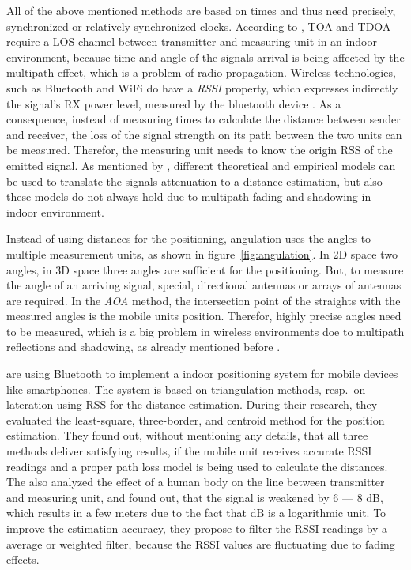 All of the above mentioned methods are based on times and thus need precisely, synchronized or relatively synchronized clocks. According to \citet{IEEE:survey_wireless_indoor_pos}, \acs{TOA} and \acs{TDOA} require a \acs{LOS} channel between transmitter and measuring unit in an indoor environment, because time and angle of the signals arrival is being affected by the multipath effect, which is a problem of radio propagation. Wireless technologies, such as Bluetooth and WiFi do have a \emph{\ac{RSSI}} property, which expresses indirectly the signal's RX power level, measured by the bluetooth device \citep{kotanen:exp_local_pos_bt}. As a consequence, instead of measuring times to calculate the distance between sender and receiver, the loss of the signal strength on its path between the two units can be measured. Therefor, the measuring unit needs to know the origin \ac{RSS} of the emitted signal. As mentioned by \citet{IEEE:survey_wireless_indoor_pos}, different theoretical and empirical models can be used to translate the signals attenuation to a distance estimation, but also these models do not always hold due to multipath fading and shadowing in indoor environment.

Instead of using distances for the positioning, angulation uses the angles to multiple measurement units, as shown in figure~\ref{fig:angulation}. In 2D space two angles, in 3D space three angles are sufficient for the positioning. But, to measure the angle of an arriving signal, special, directional antennas or arrays of antennas are required. In the \emph{\ac{AOA}} method, the intersection point of the straights with the measured angles is the mobile units position. Therefor, highly precise angles need to be measured, which is a big problem in wireless environments doe to multipath reflections and shadowing, as already mentioned before \citep{IEEE:survey_wireless_indoor_pos, wang:bt_pos}.

\citet{wang:bt_pos} are using Bluetooth to implement a indoor positioning system for mobile devices like smartphones. The system is based on triangulation methods, resp.\ on lateration using \acs{RSS} for the distance estimation. During their research, they evaluated the least-square, three-border, and centroid method for the position estimation. They found out, without mentioning any details, that all three methods deliver satisfying results, if the mobile unit receives accurate \acs{RSSI} readings and a proper path loss model is being used to calculate the distances. The also analyzed the effect of a human body on the line between transmitter and measuring unit, and found out, that the signal is weakened by 6 --- 8 dB, which results in a few meters due to the fact that dB is a logarithmic unit. To improve the estimation accuracy, they propose to filter the \acs{RSSI} readings by a average or weighted filter, because the \acs{RSSI} values are fluctuating due to fading effects.


